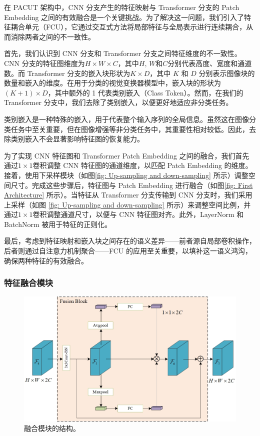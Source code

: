 \documentclass[a4paper]{ctexart}
\begin{document}
在 PACUT 架构中，CNN 分支产生的特征映射与 Transformer 分支的 Patch Embedding 之间的有效融合是一个关键挑战。为了解决这一问题，我们引入了特征耦合单元（FCU），它通过交互式方法将局部特征与全局表示进行连续耦合，从而消除两者之间的不一致性。

首先，我们认识到 CNN 分支和 Transformer 分支之间特征维度的不一致性。CNN 分支的特征图维度为$H \times W \times C$，其中$H$, $W$和$C$分别代表高度、宽度和通道数。而 Transformer 分支的嵌入块形状为$K \times D$，其中 $K$ 和 $D$ 分别表示图像块的数量和嵌入的维度。在用于分类的视觉变换器模型中，嵌入块的形状为$\left(K+1 \right) \times D$，其中额外的 1 代表类别嵌入（Class Token）。然而，在我们的 Transformer 分支中，我们去除了类别嵌入，以便更好地适应非分类任务。

类别嵌入是一种特殊的嵌入，用于代表整个输入序列的全局信息。虽然这在图像分类任务中至关重要，但在图像增强等非分类任务中，其重要性相对较低。因此，去除类别嵌入不会显著影响特征图的恢复能力。

为了实现 CNN 特征图和 Transformer Patch Embedding 之间的融合，我们首先通过$1 \times 1$卷积调整 CNN 特征图的通道维度，以匹配 Patch Embedding 的维度。接着，使用下采样模块（如图\ref{fig: Up-sampling and down-sampling} 所示）调整空间尺寸。完成这些步骤后，特征图与 Patch Embedding 进行融合（如图\ref{fig: First Architecture} 所示）。当特征从 Transformer 分支传输到 CNN 分支时，我们采用上采样（如图 \ref{fig: Up-sampling and down-sampling} 所示）来调整空间比例，并通过$ 1 \times 1$卷积调整通道尺寸，以便与 CNN 特征图对齐。此外，LayerNorm 和 BatchNorm 被用于特征的正则化。

最后，考虑到特征映射和嵌入块之间存在的语义差异——前者源自局部卷积操作，后者则通过自注意力机制聚合——FCU 的应用至关重要，以填补这一语义鸿沟，确保两种特征的有效融合。
	
\subsubsection{特征融合模块}
	
\begin{figure}[htb]
	\centering 
	\includegraphics[width=0.7\columnwidth]{picture/LLIE/My Architecture/Fusion Block}
	\caption{
		\label{fig: Fusion Block} 
		融合模块的结构。
	}
\end{figure}
	
\end{document}
